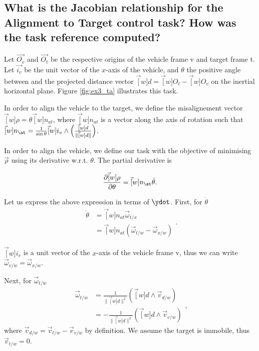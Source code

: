 \begin{parts}
		\part{What is the Jacobian relationship for the Alignment to
		Target control task? How was the task reference computed?}

		\begin{solutionorbox}

			Let $\vec{O_v}$ and $\vec{O_t}$ be the respective origins of the
			vehicle frame \cframe v and target frame \cframe t.
			Let $\vec{i_v}$ be the unit vector of the $x$-axis of
			the vehicle, and $\theta$ the positive angle between
			 and the projected distance vector
			$\vec[w]{d}=\vec[w]{O_t} - \vec[w]{O_v}$ on the inertial
			horizontal plane. Figure \ref{fig:ex3_ta} illustrates
			this task.

			In order to align the vehicle to the target, we define
			the misalignement vector $\vec[w]{\rho}=\theta
			\vec[w]{n_{at}}$, where $\vec[w]{n_{at}}$ is a vector
			along the axis of rotation such that
			$\vec[w]{n_{\at}}=\frac{1}{\sin\theta}\vec[w]{i_v}
			\wedge\left(\frac{\vec[w]{d}}{\lVert\vec[w] d \rVert
			}\right)$.

			In order to align the vehicle, we define our task with
			the objective of minimising $\vec\rho$ using its
			derivative w.r.t. $\theta$. The partial derivative is

			\[
				\frac{\partial \vec[w]\rho}{\partial\theta} =
				\vec[w]{n_{\at}}  \dot{\theta}
				\mathrm{.}
			\]

			Let us express the above expression in terms of $\ydot$.
			First, for $\dot{\theta}$
			\[
				\begin{aligned}
					\dot{\theta} &= \vec[w]{n_{at}}
					\vec\omega_{t/x}\\
						     &= \vec[w]{n_{at}}  \left(
							     \vec\omega_{t/w}
							     -
						     \vec\omega_{x/w}\right)
				\end{aligned}
				\mathrm{.}
			\]

			$\vec[w]{i_v}$ is a unit vector of the $x$-axis of the vehicle
			frame \cframe v, thus we can write $\vec\omega_{v/w}=\vec\omega_{x/w}$.

			Next, for $\vec\omega_{t/w}$
			\[
				\begin{aligned}
					\vec\omega_{t/w} &=
					\frac1{\lVert\vec[w] d\rVert^2}\left(\vec[w] d
					\wedge \vec v_{d/w}\right)\\
							 &=
							 -\frac1{\lVert\vec[w] d\rVert^2}\left(\vec[w] d
								 \wedge \vec
							 v_{v/w}\right)
				\end{aligned}
				\mathrm{,}
			\]
			where $\vec v_{d/w}=\vec v_{t/w} - \vec v_{v/w}$ by
			definition. We assume the target is immobile, thus $\vec
			v_{t/w}=0$.


\end{solutionorbox}
\end{parts}
